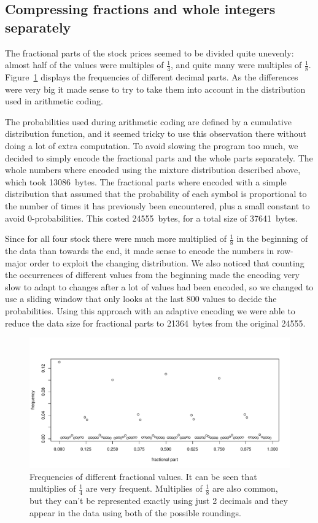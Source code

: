 \documentclass{article}
\begin{document}
\subsection{Compressing fractions and whole integers separately}

The fractional parts of the stock prices seemed to be divided quite unevenly: almost half of the values were multiples of $\frac{1}{4}$, and quite many were multiples of $\frac{1}{8}$.
Figure~\ref{fig:frac} displays the frequencies of different decimal parts.
As the differences were very big it made sense to try to take them into account in the distribution used in arithmetic coding.

The probabilities used during arithmetic coding are defined by a cumulative distribution function, and it seemed tricky to use this observation there without doing a lot of extra computation.
To avoid slowing the program too much, we decided to simply encode the fractional parts and the whole parts separately.
The whole numbers where encoded using the mixture distribution described above, which took 13086~bytes.
The fractional parts where encoded with a simple distribution that assumed that the probability of each symbol is proportional to the number of times it has previously been encountered, plus a small constant to avoid 0-probabilities.
This costed 24555~bytes, for a total size of 37641~bytes.

Since for all four stock there were much more multiplied of $\frac{1}{8}$ in the beginning of the data than towards the end, it made sense to encode the numbers in row-major order to exploit the changing distribution.
We also noticed that counting the occurrences of different values from the beginning made the encoding very slow to adapt to changes after a lot of values had been encoded, so we changed to use a sliding window that only looks at the last 800 values to decide the probabilities.
Using this approach with an adaptive encoding we were able to reduce the data size for fractional parts to 21364~bytes from the original 24555.

\begin{figure}
    \centering
    \includegraphics[scale=0.5]{frac.pdf}
    \caption{Frequencies of different fractional values. It can be seen that multiplies of $\frac{1}{4}$ are very frequent. Multiplies of $\frac{1}{8}$ are also common, but they can't be represented exactly using just 2 decimals and they appear in the data using both of the possible roundings.}
    \label{fig:frac}
\end{figure}
\end{document}
